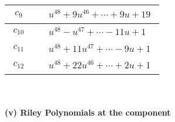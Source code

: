 \documentclass[1p]{elsarticle_modified}
\theoremstyle{definition}
\begin{document}
\begin{tabular}{m{50pt}|m{274pt}}
\hline $$\begin{aligned}c_{9}\end{aligned}$$&$\begin{aligned}
&u^{48}+9 u^{46}+\cdots+9 u+19
\end{aligned}$\\
\hline $$\begin{aligned}c_{10}\end{aligned}$$&$\begin{aligned}
&u^{48}- u^{47}+\cdots-11 u+1
\end{aligned}$\\
\hline $$\begin{aligned}c_{11}\end{aligned}$$&$\begin{aligned}
&u^{48}+11 u^{47}+\cdots-9 u+1
\end{aligned}$\\
\hline $$\begin{aligned}c_{12}\end{aligned}$$&$\begin{aligned}
&u^{48}+22 u^{46}+\cdots+2 u+1
\end{aligned}$\\
\hline
\end{tabular}\\~\\
\newpage\renewcommand{\arraystretch}{1}
\flushleft \textbf{(v) Riley Polynomials at the component}\newline \\
\end{document}
